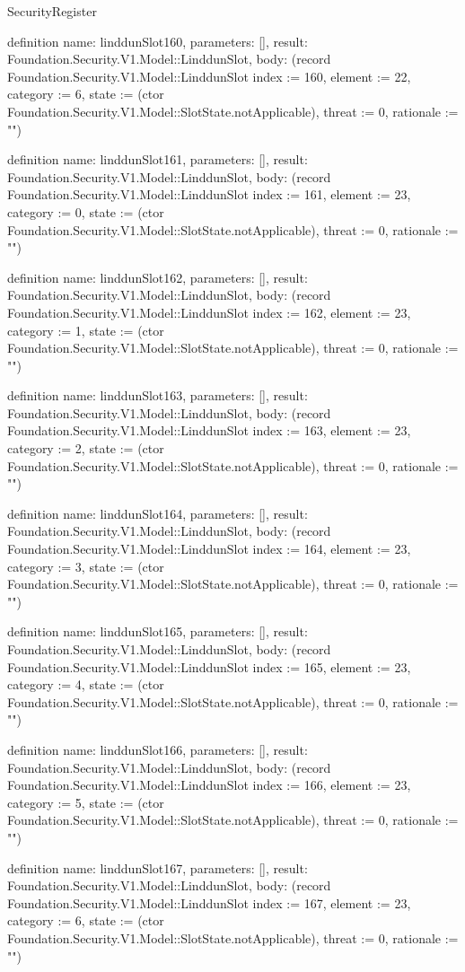 \begin{lexlean}{SecurityRegister}
\begin{semanticmodule}
definition{
  name: linddunSlot160,
  parameters: [],
  result: Foundation.Security.V1.Model::LinddunSlot,
  body: (record Foundation.Security.V1.Model::LinddunSlot {index := 160, element := 22, category := 6, state := (ctor Foundation.Security.V1.Model::SlotState.notApplicable), threat := 0, rationale := ""})
}

definition{
  name: linddunSlot161,
  parameters: [],
  result: Foundation.Security.V1.Model::LinddunSlot,
  body: (record Foundation.Security.V1.Model::LinddunSlot {index := 161, element := 23, category := 0, state := (ctor Foundation.Security.V1.Model::SlotState.notApplicable), threat := 0, rationale := ""})
}

definition{
  name: linddunSlot162,
  parameters: [],
  result: Foundation.Security.V1.Model::LinddunSlot,
  body: (record Foundation.Security.V1.Model::LinddunSlot {index := 162, element := 23, category := 1, state := (ctor Foundation.Security.V1.Model::SlotState.notApplicable), threat := 0, rationale := ""})
}

definition{
  name: linddunSlot163,
  parameters: [],
  result: Foundation.Security.V1.Model::LinddunSlot,
  body: (record Foundation.Security.V1.Model::LinddunSlot {index := 163, element := 23, category := 2, state := (ctor Foundation.Security.V1.Model::SlotState.notApplicable), threat := 0, rationale := ""})
}

definition{
  name: linddunSlot164,
  parameters: [],
  result: Foundation.Security.V1.Model::LinddunSlot,
  body: (record Foundation.Security.V1.Model::LinddunSlot {index := 164, element := 23, category := 3, state := (ctor Foundation.Security.V1.Model::SlotState.notApplicable), threat := 0, rationale := ""})
}

definition{
  name: linddunSlot165,
  parameters: [],
  result: Foundation.Security.V1.Model::LinddunSlot,
  body: (record Foundation.Security.V1.Model::LinddunSlot {index := 165, element := 23, category := 4, state := (ctor Foundation.Security.V1.Model::SlotState.notApplicable), threat := 0, rationale := ""})
}

definition{
  name: linddunSlot166,
  parameters: [],
  result: Foundation.Security.V1.Model::LinddunSlot,
  body: (record Foundation.Security.V1.Model::LinddunSlot {index := 166, element := 23, category := 5, state := (ctor Foundation.Security.V1.Model::SlotState.notApplicable), threat := 0, rationale := ""})
}

definition{
  name: linddunSlot167,
  parameters: [],
  result: Foundation.Security.V1.Model::LinddunSlot,
  body: (record Foundation.Security.V1.Model::LinddunSlot {index := 167, element := 23, category := 6, state := (ctor Foundation.Security.V1.Model::SlotState.notApplicable), threat := 0, rationale := ""})
}


\end{semanticmodule}
\end{lexlean}
